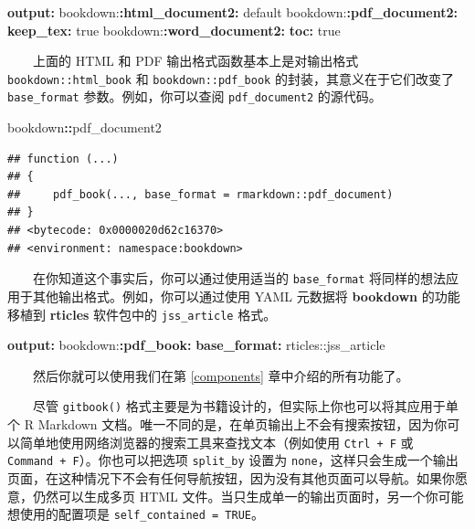 \documentclass[
  12pt,
]{krantz}
\newenvironment{Shaded}{\begin{snugshade}}{\end{snugshade}}
\newcommand{\AttributeTok}[1]{\textcolor[rgb]{0.13,0.29,0.53}{#1}}
\newcommand{\CharTok}[1]{\textcolor[rgb]{0.31,0.60,0.02}{#1}}
\newcommand{\FunctionTok}[1]{\textcolor[rgb]{0.13,0.29,0.53}{\textbf{#1}}}
\newcommand{\KeywordTok}[1]{\textcolor[rgb]{0.13,0.29,0.53}{\textbf{#1}}}
\newcommand{\NormalTok}[1]{#1}
\newcommand{\SpecialCharTok}[1]{\textcolor[rgb]{0.81,0.36,0.00}{\textbf{#1}}}
\theoremstyle{definition}
\theoremstyle{definition}
\theoremstyle{definition}
\theoremstyle{definition}
\theoremstyle{remark}
\begin{document}
\begin{Shaded}
\begin{Highlighting}[]
\FunctionTok{output}\KeywordTok{:}
\AttributeTok{  bookdown:}\FunctionTok{:html\_document2}\KeywordTok{:}\AttributeTok{ default}
\AttributeTok{  bookdown:}\FunctionTok{:pdf\_document2}\KeywordTok{:}
\AttributeTok{    }\FunctionTok{keep\_tex}\KeywordTok{:}\AttributeTok{ }\CharTok{true}
\AttributeTok{  bookdown:}\FunctionTok{:word\_document2}\KeywordTok{:}
\AttributeTok{    }\FunctionTok{toc}\KeywordTok{:}\AttributeTok{ }\CharTok{true}
\end{Highlighting}
\end{Shaded}

  上面的 HTML 和 PDF 输出格式函数基本上是对输出格式 \texttt{bookdown::html\_book} 和 \texttt{bookdown::pdf\_book} 的封装，其意义在于它们改变了 \texttt{base\_format} 参数。例如，你可以查阅 \texttt{pdf\_document2} 的源代码。

\begin{Shaded}
\begin{Highlighting}[]
\NormalTok{bookdown}\SpecialCharTok{::}\NormalTok{pdf\_document2}
\end{Highlighting}
\end{Shaded}

\begin{verbatim}
## function (...) 
## {
##     pdf_book(..., base_format = rmarkdown::pdf_document)
## }
## <bytecode: 0x0000020d62c16370>
## <environment: namespace:bookdown>
\end{verbatim}

  在你知道这个事实后，你可以通过使用适当的 \texttt{base\_format} 将同样的想法应用于其他输出格式。例如，你可以通过使用 YAML 元数据将 \textbf{bookdown} 的功能移植到 \textbf{rticles} 软件包\citep{R-rticles}中的 \texttt{jss\_article} 格式。

\begin{Shaded}
\begin{Highlighting}[]
\FunctionTok{output}\KeywordTok{:}
\AttributeTok{  bookdown:}\FunctionTok{:pdf\_book}\KeywordTok{:}
\AttributeTok{    }\FunctionTok{base\_format}\KeywordTok{:}\AttributeTok{ rticles::jss\_article}
\end{Highlighting}
\end{Shaded}

  然后你就可以使用我们在第 \ref{components} 章中介绍的所有功能了。

  尽管 \texttt{gitbook()} 格式主要是为书籍设计的，但实际上你也可以将其应用于单个 R Markdown 文档。唯一不同的是，在单页输出上不会有搜索按钮，因为你可以简单地使用网络浏览器的搜索工具来查找文本（例如使用 \texttt{Ctrl\ +\ F} 或 \texttt{Command\ +\ F}）。你也可以把选项 \texttt{split\_by} 设置为 \texttt{none}，这样只会生成一个输出页面，在这种情况下不会有任何导航按钮，因为没有其他页面可以导航。如果你愿意，仍然可以生成多页 HTML 文件。当只生成单一的输出页面时，另一个你可能想使用的配置项是 \texttt{self\_contained\ =\ TRUE}。
\end{document}
